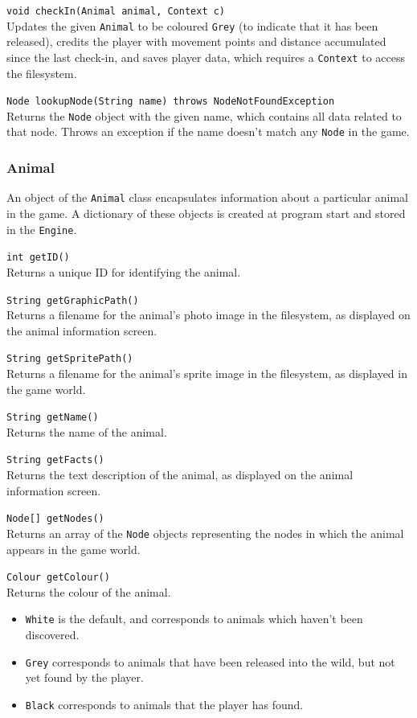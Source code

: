 \documentclass[12pt,a4paper,twoside]{article}
\begin{document}
\verb|void checkIn(Animal animal, Context c)|\\
Updates the given \verb|Animal| to be coloured \verb|Grey| (to indicate that it has been released), credits the player with movement points and distance accumulated since the last check-in, and saves player data, which requires a \verb|Context| to access the filesystem.

\verb|Node lookupNode(String name) throws NodeNotFoundException|\\
Returns the \verb|Node| object with the given name, which contains all data related to that node. Throws an exception if the name doesn't match any \verb|Node| in the game.

\subsubsection{Animal}

An object of the \verb|Animal| class encapsulates information about a particular animal in the game. A dictionary of these objects is created at program start and stored in the \verb|Engine|. 

\verb|int getID()|\\
Returns a unique ID for identifying the animal.

\verb|String getGraphicPath()|\\
Returns a filename for the animal's photo image in the filesystem, as displayed on the animal information screen.

\verb|String getSpritePath()|\\
Returns a filename for the animal's sprite image in the filesystem, as displayed in the game world.

\verb|String getName()|\\
Returns the name of the animal.

\verb|String getFacts()|\\
Returns the text description of the animal, as displayed on the animal information screen.

\verb|Node[] getNodes()|\\
Returns an array of the \verb|Node| objects representing the nodes in which the animal appears in the game world.

\verb|Colour getColour()|\\
Returns the colour of the animal.
\begin{itemize}
\item \verb|White| is the default, and corresponds to animals which haven't been discovered.
\item \verb|Grey| corresponds to animals that have been released into the wild, but not yet found by the player.
\item \verb|Black| corresponds to animals that the player has found.
\end{itemize}
\end{document}
